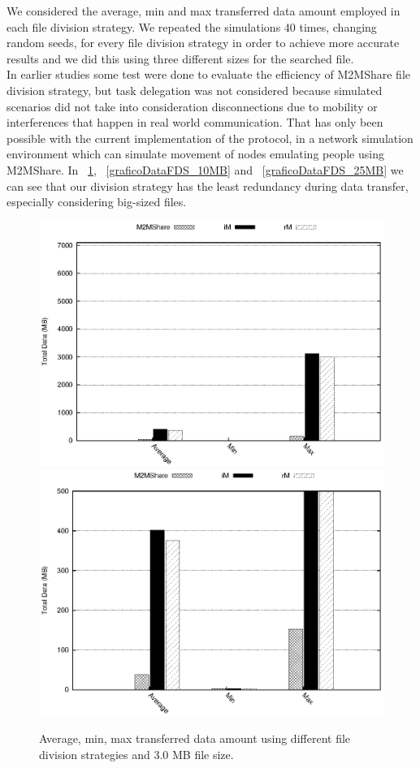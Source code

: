 We considered the average, min and max transferred data amount employed in each file division strategy. We repeated the simulations 40 times, changing random seeds, for every file division strategy in order to achieve more accurate results and we did this using three different sizes for the searched file. 
\\
In earlier studies some test were done to evaluate the efficiency of M2MShare file division strategy, but task delegation was not considered because simulated scenarios did not take into consideration disconnections due to mobility or interferences that happen in real world
communication. That has only been possible with the current implementation of the protocol, in a network simulation environment which can simulate movement of nodes emulating people using M2MShare.
In \figurename~\ref{graficoDataFDS_3MB}, \figurename~\ref{graficoDataFDS_10MB} and \figurename~\ref{graficoDataFDS_25MB} we can see that our division strategy has the least redundancy during data transfer, especially considering big-sized files.

\begin{figure}[htbp]
\centering%
\subfigure%
{\includegraphics{grafici/dataDFS_3MB.eps}}\qquad\qquad
\subfigure%
{\includegraphics{grafici/dataDFS_3MB_zoom.eps}}
\caption{Average, min, max transferred data amount using different file division strategies and 3.0 MB file size.\label{graficoDataFDS_3MB}}
\end{figure}

